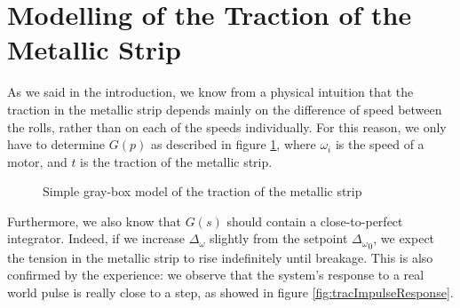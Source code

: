 \section{Modelling of the Traction of the Metallic Strip}
As we said in the introduction, we know from a physical intuition that the traction in the metallic strip depends mainly on the difference of speed between the rolls, rather than on each of the speeds individually. For this reason, we only have to determine $G(p)$ as described in figure \ref{fig:tractionInput}, where $\omega_i$ is the speed of a motor, and $t$ is the traction of the metallic strip.
\begin{figure}[htbp]
\centering
{}
\caption{\label{fig:tractionInput}Simple gray-box model of the traction of the metallic strip}
\end{figure}

Furthermore, we also know that $G(s)$ should contain a close-to-perfect integrator. Indeed, if we increase $\Delta_\omega$ slightly from the setpoint ${\Delta_\omega}_0$, we expect the tension in the metallic strip to rise indefinitely until breakage. This is also confirmed by the experience: we observe that the system's response to a real world pulse is really close to a step, as showed in figure \ref{fig:tracImpulseResponse}.

